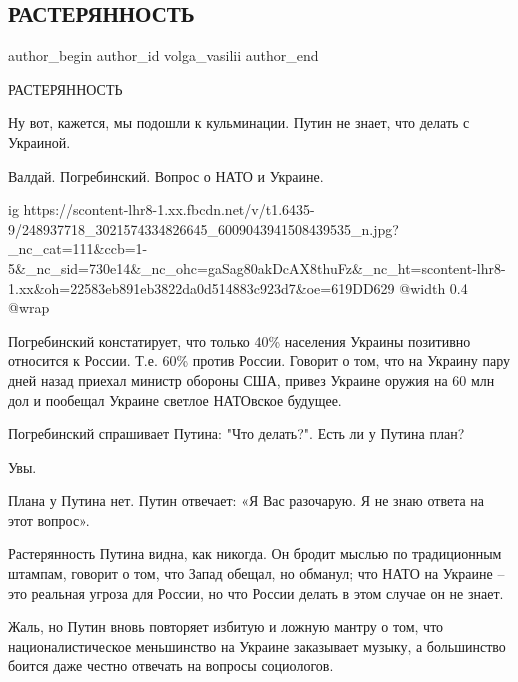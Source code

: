  
 
 
 
 
 
\subsection{РАСТЕРЯННОСТЬ}
\label{sec:25_10_2021.fb.volga_vasilii.1.rasterjannost}
 
\ifcmt
 author_begin
   author_id volga_vasilii
 author_end
\fi

РАСТЕРЯННОСТЬ

Ну вот, кажется, мы подошли к кульминации. Путин не знает, что делать с
Украиной. 

Валдай. Погребинский. Вопрос о НАТО и Украине. 

\ifcmt
  ig https://scontent-lhr8-1.xx.fbcdn.net/v/t1.6435-9/248937718_3021574334826645_6009043941508439535_n.jpg?_nc_cat=111&ccb=1-5&_nc_sid=730e14&_nc_ohc=gaSag80akDcAX8thuFz&_nc_ht=scontent-lhr8-1.xx&oh=22583eb891eb3822da0d514883c923d7&oe=619DD629
  @width 0.4
  @wrap 
\fi

Погребинский констатирует, что только 40\% населения Украины позитивно относится
к России. Т.е. 60\% против России. Говорит о том, что на Украину пару дней назад
приехал министр обороны США, привез Украине оружия на 60 млн дол и пообещал
Украине светлое НАТОвское будущее. 

Погребинский спрашивает Путина: "Что делать?". Есть ли у Путина план? 

Увы. 

Плана у Путина нет. Путин отвечает: «Я Вас разочарую. Я не знаю ответа на этот
вопрос». 

Растерянность Путина видна, как никогда. Он бродит мыслью по традиционным
штампам, говорит о том, что Запад обещал, но обманул; что НАТО на Украине – это
реальная угроза для России, но что России делать в этом случае он не знает. 

Жаль, но Путин вновь повторяет избитую и ложную мантру о том, что
националистическое меньшинство на Украине заказывает музыку, а большинство
боится даже честно отвечать на вопросы социологов. 

